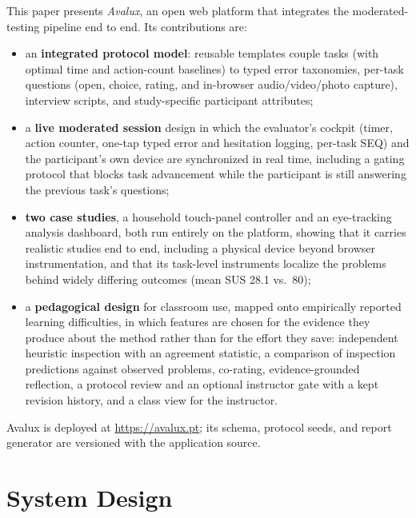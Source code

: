 \documentclass[conference]{IEEEtran}
\begin{document}
This paper presents \emph{Avalux}, an open web platform that integrates
the moderated-testing pipeline end to end. Its contributions are:
\begin{itemize}
  \item an \textbf{integrated protocol model}: reusable templates couple
  tasks (with optimal time and action-count baselines) to typed error
  taxonomies, per-task questions (open, choice, rating, and in-browser
  audio/video/photo capture), interview scripts, and study-specific
  participant attributes;
  \item a \textbf{live moderated session} design in which the evaluator's
  cockpit (timer, action counter, one-tap typed error and hesitation
  logging, per-task SEQ) and the participant's own device are synchronized
  in real time, including a gating protocol that blocks task advancement
  while the participant is still answering the previous task's questions;
  \item \textbf{two case studies}, a household touch-panel controller and
  an eye-tracking analysis dashboard, both run entirely on the platform,
  showing that it carries realistic studies end to end, including a
  physical device beyond browser instrumentation, and that its task-level
  instruments localize the problems behind widely differing outcomes
  (mean SUS 28.1 vs.\ 80);
  \item a \textbf{pedagogical design} for classroom use, mapped onto
  empirically reported learning difficulties, in which features are chosen
  for the evidence they produce about the method rather than for the effort
  they save: independent heuristic inspection with an agreement statistic,
  a comparison of inspection predictions against observed problems,
  co-rating, evidence-grounded reflection, a protocol review and an optional
  instructor gate with a kept revision history, and a class view for the
  instructor.
\end{itemize}

Avalux is deployed at \url{https://avalux.pt}; its schema, protocol
seeds, and report generator are versioned with the application source.



\section{System Design}
\end{document}
